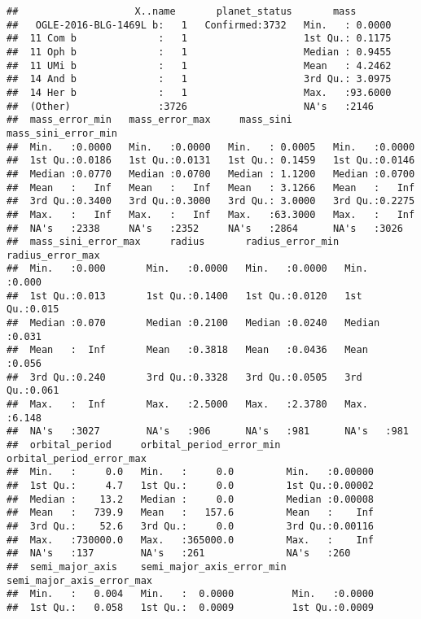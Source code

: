 \documentclass[]{article}
\begin{document}
\begin{verbatim}
##                    X..name       planet_status       mass        
##   OGLE-2016-BLG-1469L b:   1   Confirmed:3732   Min.   : 0.0000  
##  11 Com b              :   1                    1st Qu.: 0.1175  
##  11 Oph b              :   1                    Median : 0.9455  
##  11 UMi b              :   1                    Mean   : 4.2462  
##  14 And b              :   1                    3rd Qu.: 3.0975  
##  14 Her b              :   1                    Max.   :93.6000  
##  (Other)               :3726                    NA's   :2146     
##  mass_error_min   mass_error_max     mass_sini       mass_sini_error_min
##  Min.   :0.0000   Min.   :0.0000   Min.   : 0.0005   Min.   :0.0000     
##  1st Qu.:0.0186   1st Qu.:0.0131   1st Qu.: 0.1459   1st Qu.:0.0146     
##  Median :0.0770   Median :0.0700   Median : 1.1200   Median :0.0700     
##  Mean   :   Inf   Mean   :   Inf   Mean   : 3.1266   Mean   :   Inf     
##  3rd Qu.:0.3400   3rd Qu.:0.3000   3rd Qu.: 3.0000   3rd Qu.:0.2275     
##  Max.   :   Inf   Max.   :   Inf   Max.   :63.3000   Max.   :   Inf     
##  NA's   :2338     NA's   :2352     NA's   :2864      NA's   :3026       
##  mass_sini_error_max     radius       radius_error_min radius_error_max
##  Min.   :0.000       Min.   :0.0000   Min.   :0.0000   Min.   :0.000   
##  1st Qu.:0.013       1st Qu.:0.1400   1st Qu.:0.0120   1st Qu.:0.015   
##  Median :0.070       Median :0.2100   Median :0.0240   Median :0.031   
##  Mean   :  Inf       Mean   :0.3818   Mean   :0.0436   Mean   :0.056   
##  3rd Qu.:0.240       3rd Qu.:0.3328   3rd Qu.:0.0505   3rd Qu.:0.061   
##  Max.   :  Inf       Max.   :2.5000   Max.   :2.3780   Max.   :6.148   
##  NA's   :3027        NA's   :906      NA's   :981      NA's   :981     
##  orbital_period     orbital_period_error_min orbital_period_error_max
##  Min.   :     0.0   Min.   :     0.0         Min.   :0.00000         
##  1st Qu.:     4.7   1st Qu.:     0.0         1st Qu.:0.00002         
##  Median :    13.2   Median :     0.0         Median :0.00008         
##  Mean   :   739.9   Mean   :   157.6         Mean   :    Inf         
##  3rd Qu.:    52.6   3rd Qu.:     0.0         3rd Qu.:0.00116         
##  Max.   :730000.0   Max.   :365000.0         Max.   :    Inf         
##  NA's   :137        NA's   :261              NA's   :260             
##  semi_major_axis    semi_major_axis_error_min semi_major_axis_error_max
##  Min.   :   0.004   Min.   :  0.0000          Min.   :0.0000           
##  1st Qu.:   0.058   1st Qu.:  0.0009          1st Qu.:0.0009           

\end{verbatim}
\end{document}
